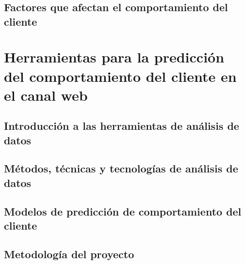 \documentclass{report}
\begin{document}
\subsection{Factores que afectan el comportamiento del cliente}


\section{Herramientas para la predicción del comportamiento del cliente en el canal web}

\subsection{Introducción a las herramientas de análisis de datos}


\subsection{Métodos, técnicas y tecnologías de análisis de datos}


\subsection{Modelos de predicción de comportamiento del cliente}





\subsection{Metodología del proyecto}

\end{document}
